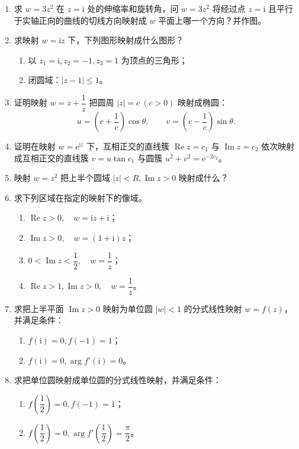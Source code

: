 \documentclass[UTF8,11pt,a4paper]{ctexart}
\newcommand{\ee}{\mathrm{e}}
\newcommand{\ii}{\mathrm{i}}
\newcommand{\Ree}{\operatorname{Re}}
\newcommand{\Imm}{\operatorname{Im}}
\begin{document}
\begin{enumerate}
\item 求 $w=3z^2$ 在 $z=\ii$ 处的伸缩率和旋转角，问 $w=3z^2$ 将经过点 $z=\ii$ 且平行于实轴正向的曲线的切线方向映射成 $w$ 平面上哪一个方向？并作图。

\item 求映射 $w=\ii z$ 下，下列图形映射成什么图形？
  \begin{enumerate}
  \item 以 $z_1=\ii,z_2=-1,z_3=1$ 为顶点的三角形；
  \item 闭圆域：$|z-1|\leqslant1$。
  \end{enumerate}

\item 证明映射 $w=z+\dfrac1z$ 把圆周 $|z|=c\ (c>0)$ 映射成椭圆：
\[
u=\left(c+\frac1c\right)\cos\theta,\qquad
v=\left(c-\frac1c\right)\sin\theta.
\]

\item 证明在映射 $w=\ee^{\ii z}$ 下，互相正交的直线簇 $\Ree z=c_1$ 与 $\Imm z=c_2$ 依次映射成互相正交的直线簇
$v=u\tan c_1$ 与圆簇 $u^2+v^2=\ee^{-2c_2}$。

\item 映射 $w=z^2$ 把上半个圆域 $|z|<R,\Imm z>0$ 映射成什么？

\item 求下列区域在指定的映射下的像域。
  \begin{enumerate}
  \item $\Ree z>0,\quad w=\ii z+\ii$；
  \item $\Imm z>0,\quad w=(1+\ii)z$；
  \item $0<\Imm z<\dfrac12,\quad w=\dfrac1z$；
  \item $\Ree z>1,\Imm z>0,\quad w=\dfrac1z$。
  \end{enumerate}

\item 求把上半平面 $\Imm z>0$ 映射为单位圆 $|w|<1$ 的分式线性映射 $w=f(z)$，并满足条件：
  \begin{enumerate}
  \item $f(\ii)=0,f(-1)=1$；
  \item $f(\ii)=0,\arg f'(\ii)=0$。
  \end{enumerate}

\item 求把单位圆映射成单位圆的分式线性映射，并满足条件：
  \begin{enumerate}
  \item $f\left(\dfrac12\right)=0,f(-1)=1$；
  \item $f\left(\dfrac12\right)=0,\arg f'\left(\dfrac12\right)=\dfrac\pi2$。
  \end{enumerate}


\end{enumerate}
\end{document}
